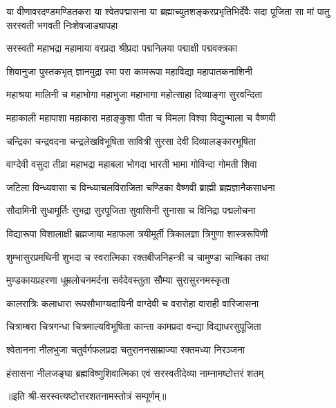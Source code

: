 

{या वीणावरदण्डमण्डितकरा या श्वेतपद्मासना}
{या ब्रह्माच्युतशङ्करप्रभृतिभिर्देवैः सदा पूजिता}
{सा मां पातु सरस्वती भगवती निःशेषजाड्यापहा}

\twolineshloka
{सरस्वती महाभद्रा महामाया वरप्रदा}
{श्रीप्रदा पद्मनिलया पद्माक्षी पद्मवक्त्रका}

\twolineshloka
{शिवानुजा पुस्तकभृत् ज्ञानमुद्रा रमा परा}
{कामरूपा महाविद्या महापातकनाशिनी}

\twolineshloka
{महाश्रया मालिनी च महाभोगा महाभुजा}
{महाभागा महोत्साहा दिव्याङ्गा सुरवन्दिता}

\twolineshloka
{महाकाली महापाशा महाकारा महाङ्कुशा}
{पीता च विमला विश्वा विद्युन्माला च वैष्णवी}

\twolineshloka
{चन्द्रिका चन्द्रवदना चन्द्रलेखविभूषिता}
{सावित्री सुरसा देवी दिव्यालङ्कारभूषिता}

\twolineshloka
{वाग्देवी वसुदा तीव्रा महाभद्रा महाबला}
{भोगदा भारती भामा गोविन्दा गोमती शिवा}

\twolineshloka
{जटिला विन्ध्यवासा च विन्ध्याचलविराजिता}
{चण्डिका वैष्णवी ब्राह्मी ब्रह्मज्ञानैकसाधना}

\twolineshloka
{सौदामिनी सुधामूर्तिः सुभद्रा सुरपूजिता}
{सुवासिनी सुनासा च विनिद्रा पद्मलोचना}

\twolineshloka
{विद्यारूपा विशालाक्षी ब्रह्मजाया महाफला}
{त्रयीमूर्ती त्रिकालज्ञा त्रिगुणा शास्त्ररूपिणी}

\twolineshloka
{शुम्भासुरप्रमथिनी शुभदा च स्वरात्मिका}
{रक्तबीजनिहन्त्री च चामुण्डा चाम्बिका तथा}

\twolineshloka
{मुण्डकायप्रहरणा धूम्रलोचनमर्दना}
{सर्वदेवस्तुता सौम्या सुरासुरनमस्कृता}

\twolineshloka
{कालरात्रिः कलाधारा रूपसौभाग्यदायिनी}
{वाग्देवी च वरारोहा वाराही वारिजासना}

\twolineshloka
{चित्राम्बरा चित्रगन्धा चित्रमाल्यविभूषिता}
{कान्ता कामप्रदा वन्द्या विद्याधरसुपूजिता}

\twolineshloka
{श्वेतानना नीलभुजा चतुर्वर्गफलप्रदा}
{चतुराननसाम्राज्या रक्तमध्या निरञ्जना}

\twolineshloka
{हंसासना नीलजङ्घा ब्रह्मविष्णुशिवात्मिका}
{एवं सरस्वतीदेव्या नाम्नामष्टोत्तरं शतम्}

॥इति श्री-सरस्वत्यष्टोत्तरशतनामस्तोत्रं सम्पूर्णम्॥